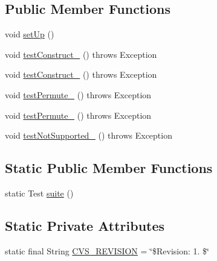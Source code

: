 \subsection*{Public Member Functions}
\begin{DoxyCompactItemize}
\item 
void \hyperlink{classorg_1_1jgap_1_1audit_1_1_permuting_configuration_test_a0a598201e0be9871f5e9a4d359ae3452}{set\-Up} ()
\item 
void \hyperlink{classorg_1_1jgap_1_1audit_1_1_permuting_configuration_test_a5ecd1fbbc0dea6f8e4ebaafa619ac29c}{test\-Construct\-\_} ()  throws Exception 
\item 
void \hyperlink{classorg_1_1jgap_1_1audit_1_1_permuting_configuration_test_a49f97691ba72a67a7bf2a1bc6fa0d9b2}{test\-Construct\-\_} ()  throws Exception 
\item 
void \hyperlink{classorg_1_1jgap_1_1audit_1_1_permuting_configuration_test_a236881d62a43885dd72ff12aa3f86b18}{test\-Permute\-\_} ()  throws Exception 
\item 
void \hyperlink{classorg_1_1jgap_1_1audit_1_1_permuting_configuration_test_a50781f00879f72591bb4c0f6f61f7653}{test\-Permute\-\_} ()  throws Exception 
\item 
void \hyperlink{classorg_1_1jgap_1_1audit_1_1_permuting_configuration_test_a4650f41444ce75ea198ed9d58d97378b}{test\-Not\-Supported\-\_} ()  throws Exception 
\end{DoxyCompactItemize}
\subsection*{Static Public Member Functions}
\begin{DoxyCompactItemize}
\item 
static Test \hyperlink{classorg_1_1jgap_1_1audit_1_1_permuting_configuration_test_a66e8f5e1033b3998dcef8147ce589238}{suite} ()
\end{DoxyCompactItemize}
\subsection*{Static Private Attributes}
\begin{DoxyCompactItemize}
\item 
static final String \hyperlink{classorg_1_1jgap_1_1audit_1_1_permuting_configuration_test_a8d635d11a7c5a9460d7449c1abd474d2}{C\-V\-S\-\_\-\-R\-E\-V\-I\-S\-I\-O\-N} = \char`\"{}\$Revision\-: 1. \$\char`\"{}
\end{DoxyCompactItemize}

